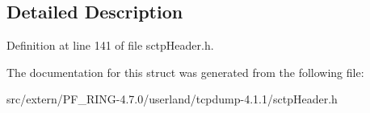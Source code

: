 \subsection{Detailed Description}


Definition at line 141 of file sctpHeader.h.



The documentation for this struct was generated from the following file:\begin{DoxyCompactItemize}
\item 
src/extern/PF\_\-RING-\/4.7.0/userland/tcpdump-\/4.1.1/sctpHeader.h\end{DoxyCompactItemize}
